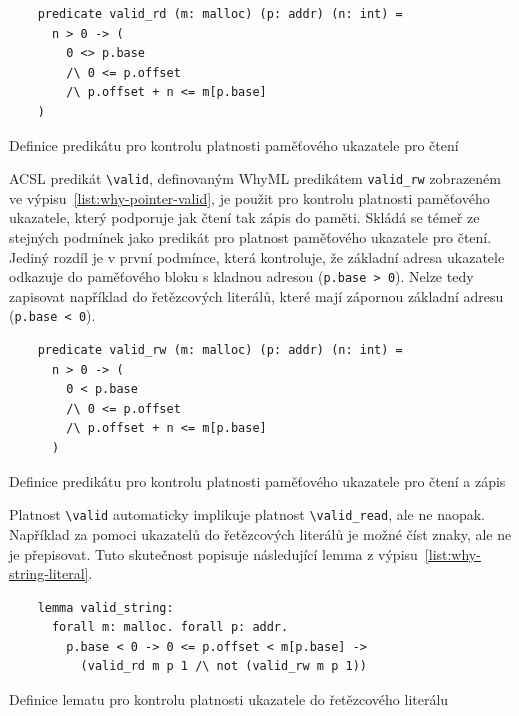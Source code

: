 
\begin{listing}[H]
    \begin{verbatim}
    predicate valid_rd (m: malloc) (p: addr) (n: int) =
      n > 0 -> (
        0 <> p.base
        /\ 0 <= p.offset
        /\ p.offset + n <= m[p.base]
    )
    \end{verbatim}
    \caption{Definice predikátu pro kontrolu platnosti paměťového ukazatele pro čtení}
    \label{list:why-pointer-valid-read}
\end{listing}

ACSL predikát \texttt{\textbackslash valid},
definovaným WhyML predikátem \texttt{valid\_rw} zobrazeném ve výpisu~\ref{list:why-pointer-valid},
je použit pro kontrolu platnosti paměťového ukazatele,
který podporuje jak čtení tak zápis do paměti.
Skládá se témeř ze stejných podmínek jako predikát pro platnost paměťového ukazatele pro čtení.
Jediný rozdíl je v první podmínce, která kontroluje,
že základní adresa ukazatele odkazuje do paměťového bloku s kladnou adresou (\texttt{p.base > 0}).
Nelze tedy zapisovat například do řetězcových literálů,
které mají zápornou základní adresu (\texttt{p.base < 0}).

\begin{listing}[H]
    \begin{verbatim}
    predicate valid_rw (m: malloc) (p: addr) (n: int) =
      n > 0 -> (
        0 < p.base
        /\ 0 <= p.offset
        /\ p.offset + n <= m[p.base]
      )
    \end{verbatim}
    \caption{Definice predikátu pro kontrolu platnosti paměťového ukazatele pro čtení a zápis}
    \label{list:why-pointer-valid}
\end{listing}

Platnost \texttt{\textbackslash valid} automaticky implikuje platnost \texttt{\textbackslash valid\_read},
ale ne naopak.
Například za pomoci ukazatelů do řetězcových literálů je možné číst znaky,
ale ne je přepisovat.
Tuto skutečnost popisuje následující lemma z výpisu~\ref{list:why-string-literal}.

\begin{listing}[H]
    \begin{verbatim}
    lemma valid_string:
      forall m: malloc. forall p: addr.
        p.base < 0 -> 0 <= p.offset < m[p.base] ->
          (valid_rd m p 1 /\ not (valid_rw m p 1))
    \end{verbatim}
    \caption{Definice lematu pro kontrolu platnosti ukazatele do řetězcového literálu}
    \label{list:why-string-literal}
\end{listing}

